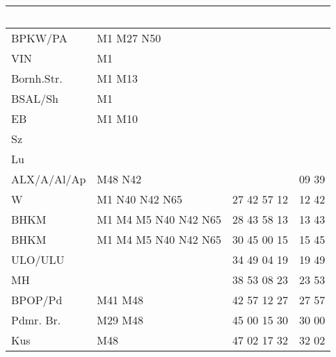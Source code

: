 \begin{tabular}{!{\color{schiefergrau}\vrule width 3pt}*{4}{l!{\color{schiefergrau}\vrule width 3pt}}}
\hline
{}
 & \textcolor{white}{\bfseries WE} \\
\hline
BPKW/PA      & \mtram{} M1 \mbus{} M27 \nbus{} N50                               & &       \\
VIN          & \mtram{} M1                                                       & &       \\
Bornh.Str.   & \mtram{} M1 M13                                                   & &       \\
BSAL/Sh      & \mtram{} M1                                                       & &       \\
EB           & \mtram{} M1 M10                                                   & &       \\
Sz           &                                                                   & &       \\
Lu           &                                                                   & &       \\
ALX/A/Al/Ap  & \mbus{} M48 \nbus{} N42                                           &             & 09 39 \\ 
W            & \nufuenf{} \nuacht{} \mtram{} M1 \nbus{} N40 N42 N65              & 27 42 57 12 & 12 42 \\
BHKM         & \nufuenf{} \nuacht{} \mtram{} M1 M4 M5 \nbus{} N40 N42 N65        & 28 43 58 13 & 13 43 \\
\hline
BHKM         & \nufuenf{} \nuacht{} \mtram{} M1 M4 M5 \nbus{} N40 N42 N65        & 30 45 00 15 & 15 45 \\
ULO/ULU      & \nusechs{}                                                        & 34 49 04 19 & 19 49 \\
MH           &                                                                   & 38 53 08 23 & 23 53 \\
BPOP/Pd      & \mbus{} M41 M48                                                   & 42 57 12 27 & 27 57 \\
Pdmr. Br.    & \nueins{} \mbus{} M29 M48                                         & 45 00 15 30 & 30 00 \\
Kus          & \nueins{} \mbus{} M48                                             & 47 02 17 32 & 32 02 \\

\end{tabular}
